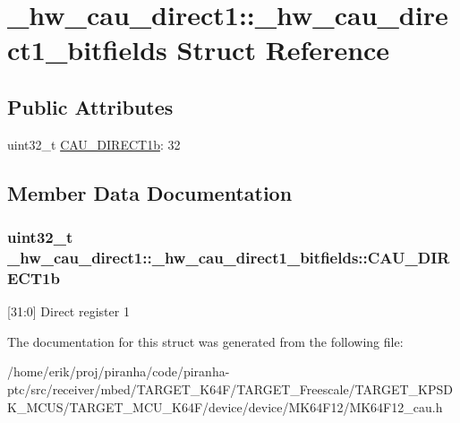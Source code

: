 \hypertarget{struct__hw__cau__direct1_1_1__hw__cau__direct1__bitfields}{}\section{\+\_\+hw\+\_\+cau\+\_\+direct1\+:\+:\+\_\+hw\+\_\+cau\+\_\+direct1\+\_\+bitfields Struct Reference}
\label{struct__hw__cau__direct1_1_1__hw__cau__direct1__bitfields}
\subsection*{Public Attributes}
\begin{DoxyCompactItemize}
\item 
uint32\+\_\+t \hyperlink{struct__hw__cau__direct1_1_1__hw__cau__direct1__bitfields_a30ee86937f41c55c6b114e913b9e9dd4}{C\+A\+U\+\_\+\+D\+I\+R\+E\+C\+T1b}\+: 32
\end{DoxyCompactItemize}


\subsection{Member Data Documentation}
\subsubsection[{\texorpdfstring{C\+A\+U\+\_\+\+D\+I\+R\+E\+C\+T1b}{CAU_DIRECT1b}}]{\setlength{\rightskip}{0pt plus 5cm}uint32\+\_\+t \+\_\+hw\+\_\+cau\+\_\+direct1\+::\+\_\+hw\+\_\+cau\+\_\+direct1\+\_\+bitfields\+::\+C\+A\+U\+\_\+\+D\+I\+R\+E\+C\+T1b}\hypertarget{struct__hw__cau__direct1_1_1__hw__cau__direct1__bitfields_a30ee86937f41c55c6b114e913b9e9dd4}{}\label{struct__hw__cau__direct1_1_1__hw__cau__direct1__bitfields_a30ee86937f41c55c6b114e913b9e9dd4}
\mbox{[}31\+:0\mbox{]} Direct register 1 

The documentation for this struct was generated from the following file\+:\begin{DoxyCompactItemize}
\item 
/home/erik/proj/piranha/code/piranha-\/ptc/src/receiver/mbed/\+T\+A\+R\+G\+E\+T\+\_\+\+K64\+F/\+T\+A\+R\+G\+E\+T\+\_\+\+Freescale/\+T\+A\+R\+G\+E\+T\+\_\+\+K\+P\+S\+D\+K\+\_\+\+M\+C\+U\+S/\+T\+A\+R\+G\+E\+T\+\_\+\+M\+C\+U\+\_\+\+K64\+F/device/device/\+M\+K64\+F12/M\+K64\+F12\+\_\+cau.\+h\end{DoxyCompactItemize}
